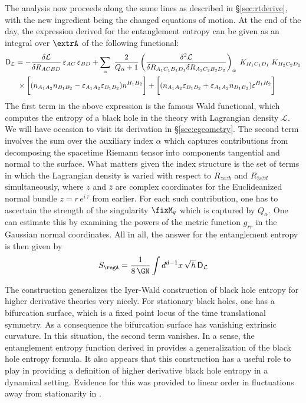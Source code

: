 \documentclass[12pt,openany]{book}
\begin{document}
The analysis now proceeds along the same lines as described in \S\ref{sec:rtderive}, with the new ingredient being the changed equations of motion. At the end of the day, the expression derived for the entanglement entropy can be given as an integral over $\extrA$ of the following functional:
%
\begin{equation}
\begin{split}
{\sf D}_\mathcal{L} &= -\frac{\delta \mathcal{L}}{\delta R_{ACBD} }\, \varepsilon_{AC}\, \varepsilon_{BD} +
\sum_{\alpha} \;  \frac{2}{Q_\alpha+1} \left(\frac{\delta^2 \mathcal{L}}{\delta R_{A_1C_1 B_1D_1} \delta R_{A_2 C_2 B_2D_2 } }\right)_\alpha\; K_{H_1 C_1 D_1}\; K_{H_2 C_2 D_2}
\\
& \; \times
\bigg[(n_{A_1 A_2} n_{B_1 B_2} - \varepsilon_{A_1 A_2} \varepsilon_{B_1 B_2}) n^{H_1 H_2} \bigg]
+
\bigg[(n_{A_1 A_2} \varepsilon_{B_1 B_2} + \varepsilon_{A_1 A_2} n_{B_1 B_2}) \varepsilon^{H_1 H_2} \bigg]
\end{split}
\label{eq:dong}
\end{equation}
%
The first term in the above expression is the famous Wald functional, which computes the entropy of a black hole in the theory with Lagrangian density $\mathcal{L}$. We will have occasion to visit its derivation in \S\ref{sec:egeometry}. The second term involves the sum over the auxiliary index $\alpha$ which captures contributions from decomposing the spacetime Riemann tensor into components tangential and normal to the surface.  What matters given the index structure is the set of terms in which the Lagrangian density is varied with respect to  $R_{zazb} $ and $R_{{\bar z} c {\bar z} d }$ simultaneously, where $z$ and ${\bar z}$ are complex coordinates for the Euclideanized normal bundle $z = r\, e^{i\, \tau}$ from earlier. For each such contribution, one has to ascertain the strength of the singularity $\fixM_q$ which is captured by
$Q_\alpha$. One can estimate this by examining the powers of the  metric function $g_{rr}$ in the Gaussian normal coordinates. All in all, the answer for the entanglement entropy is then given by
%
\begin{equation}
S_\regA = \frac{1}{8\, \GN } \int d^{d-1} x \, \sqrt{h}\, {\sf D}_\mathcal{L}
\label{}
\end{equation}
%

The construction generalizes the Iyer-Wald construction \cite{Iyer:1994ys} of black hole entropy for higher derivative theories very nicely. For stationary black  holes, one has a bifurcation surface, which is a fixed point locus of the time translational symmetry. As a consequence the bifurcation surface has vanishing extrinsic curvature. In this situation, the second term vanishes. In a sense, the entanglement entropy function derived  in \cite{Dong:2013qoa} provides  a generalization of the black hole entropy formula. It also appears that this construction has a useful role to play in providing a definition of higher derivative black hole entropy in a dynamical setting. Evidence for this was provided to linear order in fluctuations away from stationarity in \cite{Bhattacharjee:2015yaa,Wall:2015raa}.
\end{document}
